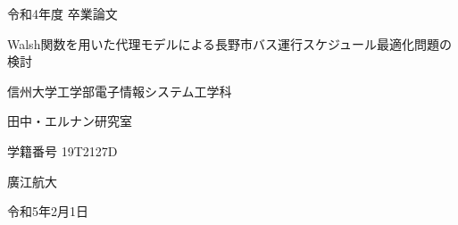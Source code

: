 \documentclass[main]{subfiles}
\begin{document}
\begin{titlepage}
    \fontsize{30truept}{30truept}\selectfont

    \centering
    \Huge
    令和4年度 卒業論文
    \vspace{15truept}

    Walsh関数を用いた代理モデルによる長野市バス運行スケジュール最適化問題の検討
    \vspace{45truept}

    信州大学工学部電子情報システム工学科
    \vspace{45truept}

    田中・エルナン研究室
    \vspace{15truept}

    学籍番号 19T2127D
    \vspace{15truept}

    廣江航大
    \vspace{45truept}

    令和5年2月1日
    \vspace{45truept}
\end{titlepage}
\end{document}
